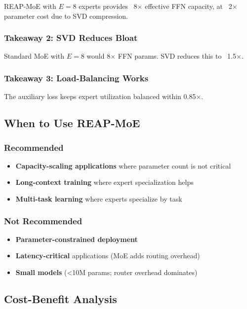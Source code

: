 REAP-MoE with $E = 8$ experts provides ~8$\times$ effective FFN capacity, at ~2$\times$ 
parameter cost due to SVD compression.

\subsubsection{Takeaway 2: SVD Reduces Bloat}

Standard MoE with $E = 8$ would 8$\times$ FFN params. SVD reduces this to ~1.5$\times$.

\subsubsection{Takeaway 3: Load-Balancing Works}

The auxiliary loss keeps expert utilization balanced within 0.85$\times$.

\subsection{When to Use REAP-MoE}

\subsubsection{Recommended}
\begin{itemize}
\item \textbf{Capacity-scaling applications} where parameter count is not critical
\item \textbf{Long-context training} where expert specialization helps
\item \textbf{Multi-task learning} where experts specialize by task

\end{itemize}
\subsubsection{Not Recommended}
\begin{itemize}
\item \textbf{Parameter-constrained deployment}
\item \textbf{Latency-critical} applications (MoE adds routing overhead)
\item \textbf{Small models} (<10M params; router overhead dominates)

\end{itemize}
\subsection{Cost-Benefit Analysis}


